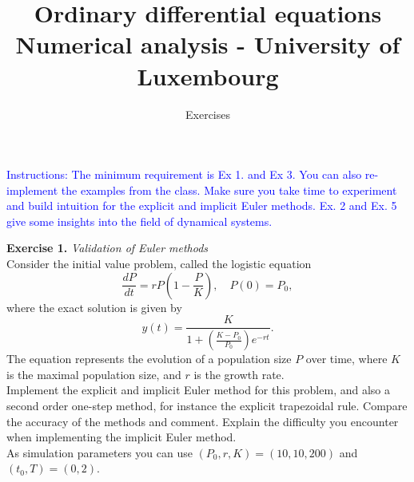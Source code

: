 \documentclass{article}
\title{Ordinary differential equations \\[1ex] \large Numerical analysis - University of Luxembourg}
\author{Exercises}
\date{}
\begin{document}
\maketitle

\noindent \textcolor{blue}{Instructions: The minimum requirement is Ex 1. and Ex 3. You can also re-implement the examples from the class. Make sure you take time to experiment and build intuition for the explicit and implicit Euler methods. Ex. 2 and Ex. 5 give some insights into the field of dynamical systems.}

\vspace{0.5cm}
\noindent \textbf{Exercise 1.} \textit{Validation of Euler methods} \\
Consider the initial value problem, called the logistic equation
$$ \frac{dP}{dt} = r P \left(1- \frac{P}{K}\right), \quad P(0)= P_0, $$
where the exact solution is given by
$$y(t)=\frac{K}{ 1+ \left(\frac{K-P_0}{P_0}\right) e^{-rt}}.$$
The equation represents the evolution of a population size $P$ over time, where $K$ is the maximal population size, and $r$ is the growth rate.
\vspace{0.2cm} \\
Implement the explicit and implicit Euler method for this problem, and also a second order one-step method, for instance the explicit trapezoidal rule. Compare the accuracy of the methods and comment. Explain the difficulty you encounter when implementing the implicit Euler method. \\ 
As simulation parameters you can use $(P_0, r, K) = (10, 10, 200)$ and $(t_0, T) = (0, 2)$.
\end{document}
